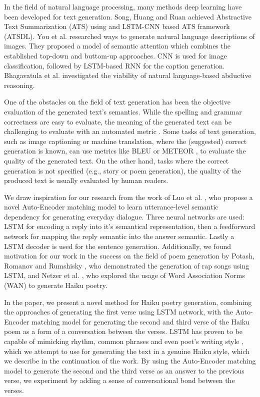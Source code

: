 \documentclass{acm_proc_article-sp}
\begin{document}
In the field of natural language processing, many methods deep learning have been developed for text generation. Song, Huang and Ruan \cite{song2019abstractive} achieved Abstractive Text Summarization (ATS) using and LSTM-CNN based ATS framework (ATSDL). You et al. \cite{You_2016_CVPR} researched ways to generate natural language descriptions of images. They proposed a model of semantic attention which combines the established top-down and buttom-up approaches. CNN is used for image classification, followed by LSTM-based RNN for the caption generation. Bhagavatula et al. \cite{bhagavatula2020abductive} investigated the viability of natural language-based abductive reasoning.

One of the obstacles on the field of text generation has been the objective evaluation of the generated text's semantics. While the spelling and grammar correctness are easy to evaluate, the meaning of the generated text can be challenging to evaluate with an automated metric \cite{celikyilmaz2020evaluation}. Some tasks of text generation, such as image captioning or machine translation, where the (suggested) correct generation is known, can use metrics like BLEU \cite{papineni2002bleu} or METEOR \cite{banerjee2005meteor}, to evaluate the quality of the generated text. On the other hand, tasks where the correct generation is not specified (e.g., story \cite{pawade2018story} or poem \cite{zhang2014chinese} generation), the quality of the produced text is usually evaluated by human readers.

We draw inspiration for our research from the work of Luo et al. \cite{luo2018autoencoder}, who propose a novel Auto-Encoder matching model to learn utterance-level semantic dependency for generating everyday dialogue. Three neural networks are used: LSTM for encoding a reply into it's semantical representation, then a feedforward network for mapping the reply semantic into the answer semantic. Lastly a LSTM decoder is used for the sentence generation. Additionally, we found motivation for our work in the success on the field of poem generation by Potash, Romanov and Rumshisky \cite{potash2015ghostwriter}, who demonstrated the generation of rap songs using LSTM, and Netzer et al. \cite{netzer2009gaiku}, who explored the usage of Word Association Norms (WAN) to generate Haiku poetry.

In the paper, we present a novel method for Haiku poetry generation, combining the approaches of generating the first verse using LSTM network, with the Auto-Encoder matching model \cite{luo2018autoencoder} for generating the second and third verse of the Haiku poem as a form of a conversation between the verses. LSTM has proven to be capable of mimicking rhythm, common phrases and even poet's writing style \cite{potash2015ghostwriter}, which we attempt to use for generating the text in a genuine Haiku style, which we describe in the continuation of the work. By using the Auto-Encoder matching model to generate the second and the third verse as an answer to the previous verse, we experiment by adding a sense of conversational bond between the verses.
\end{document}
